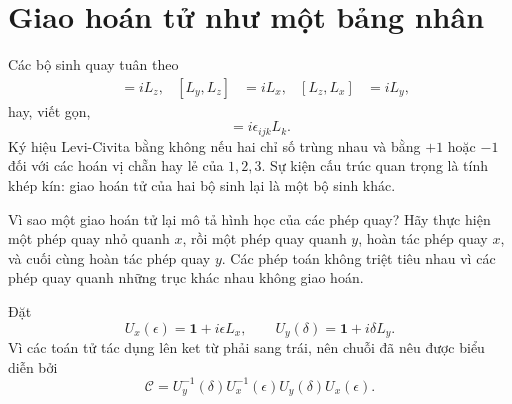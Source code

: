 \section{Giao hoán tử như một bảng nhân}

Các bộ sinh quay tuân theo
\begin{align}
[L_x,L_y]&=iL_z,&
[L_y,L_z]&=iL_x,&
[L_z,L_x]&=iL_y,
\end{align}
hay, viết gọn,
\begin{equation}
[L_i,L_j]=i\epsilon_{ijk}L_k.
\end{equation}
Ký hiệu Levi-Civita bằng không nếu hai chỉ số trùng nhau và bằng \(+1\) hoặc \(-1\) đối với các hoán vị chẵn hay lẻ của \(1,2,3\). Sự kiện cấu trúc quan trọng là tính khép kín: giao hoán tử của hai bộ sinh lại là một bộ sinh khác.

Vì sao một giao hoán tử lại mô tả hình học của các phép quay? Hãy thực hiện một phép quay nhỏ quanh \(x\), rồi một phép quay quanh \(y\), hoàn tác phép quay \(x\), và cuối cùng hoàn tác phép quay \(y\). Các phép toán không triệt tiêu nhau vì các phép quay quanh những trục khác nhau không giao hoán.

\begin{classroomqa}
\end{classroomqa}

Đặt
\begin{equation}
U_x(\epsilon)=\mathbf 1+i\epsilon L_x,
\qquad
U_y(\delta)=\mathbf 1+i\delta L_y.
\end{equation}
Vì các toán tử tác dụng lên ket từ phải sang trái, nên chuỗi đã nêu được biểu diễn bởi
\begin{equation}
\mathcal C
=U_y^{-1}(\delta)U_x^{-1}(\epsilon)
 U_y(\delta)U_x(\epsilon).
\end{equation}

\begin{classroomqa}
\end{classroomqa}

